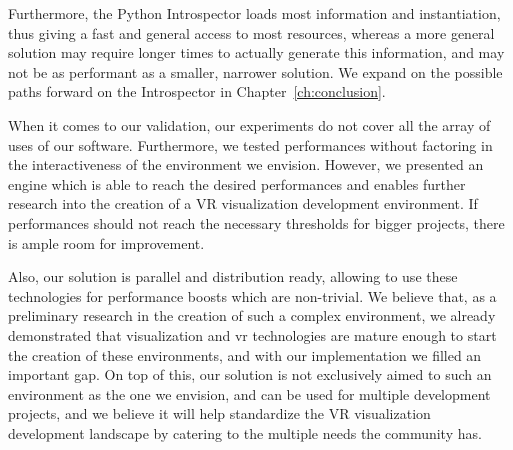 Furthermore, the Python Introspector loads most information and instantiation, thus giving a fast and general access to most resources, whereas a more general solution may require longer times to actually generate this information, and may not be as performant as a smaller, narrower solution. We expand on the possible paths forward on the Introspector in Chapter~\ref{ch:conclusion}.

When it comes to our validation, our experiments do not cover all the array of uses of our software. Furthermore, we tested performances without factoring in the interactiveness of the environment we envision. However, we presented an engine which is able to reach the desired performances and enables further research into the creation of a VR visualization development environment. If performances should not reach the necessary thresholds for bigger projects, there is ample room for improvement.

Also, our solution is parallel and distribution ready, allowing to use these technologies for performance boosts which are non-trivial. We believe that, as a preliminary research in the creation of such a complex environment, we already demonstrated that visualization and \acrshort{vr} technologies are mature enough to start the creation of these environments, and with our implementation we filled an important gap. On top of this, our solution is not exclusively aimed to such an environment as the one we envision, and can be used for multiple development projects, and we believe it will help standardize the VR visualization development landscape by catering to the multiple needs the community has.
